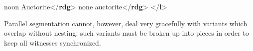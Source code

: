 \begin{shaded}
\hspace*{1em}\hspace*{1em}\hspace*{1em}noon Auctorite{</\textbf{rdg}>}\mbox{}\newline 
\hspace*{1em}\hspace*{1em}\hspace*{1em}none auctorite{</\textbf{rdg}>}\mbox{}\newline 
\hspace*{1em}\hspace*{1em}\mbox{}\newline 
\hspace*{1em}\mbox{}\newline 
{}\mbox{}\newline 
{</\textbf{l}>}\end{shaded}\egroup\par \par
Parallel segmentation cannot, however, deal very gracefully with variants which overlap without nesting: such variants must be broken up into pieces in order to keep all witnesses synchronized. 
